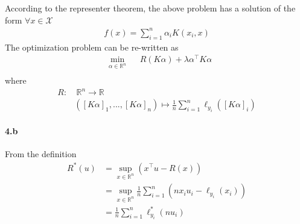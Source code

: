 \documentclass[10pt]{article}
\begin{document}
    According to the representer theorem, the above problem has a solution of
    the form $\forall x\in \mathcal{X}$
    \begin{align*}
        f(x) = \sum_{i=1}^n \alpha_i K(x_i, x)
    \end{align*}
    The optimization problem can be re-written as 
    \begin{equation*}
        \begin{aligned}
        & \underset{\alpha\in\mathbb{R}^n}{\text{min}}
        & & R(K\alpha) + \lambda \alpha^\top K \alpha\\
        \end{aligned}
    \end{equation*} 
    where 
    \begin{align*}
        R:& \ \mathbb{R}^n \rightarrow \mathbb{R}\\
        & ([K\alpha]_1, ..., [K\alpha]_n) \mapsto \frac{1}{n}\sum_{i=1}^n
        \ell_{y_i}([K\alpha]_i)
    \end{align*}

    \paragraph{4.b} From the definition
    \begin{align*}
        R^*(u) &= \sup_{x \in \mathbb{R}^n}\left( x^\top u - R(x) \right) \\
        &= \sup_{x \in \mathbb{R}^n} \frac{1}{n}\sum_{i=1}^n (nx_i u_i - 
        \ell_{y_i}(x_i))\\
        &= \frac{1}{n}\sum_{i=1}^n \ell^*_{y_i}(nu_i)
    \end{align*}
        
\end{document}
